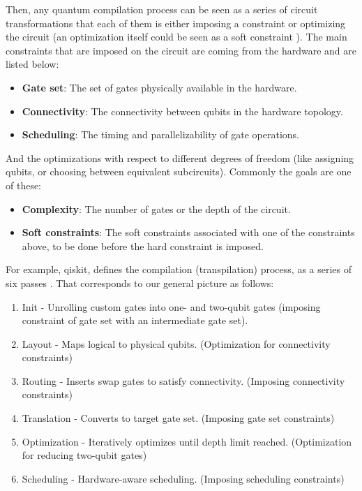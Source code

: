 \documentclass{report}
\begin{document}
Then, any quantum compilation process can be seen as a series of circuit transformations that each of them is either imposing a constraint or optimizing the circuit (an optimization itself could be seen as a soft constraint \cite{}). The main constraints that are imposed on the circuit are coming from the hardware and are listed below:

\begin{itemize}
  \item \textbf{Gate set}: The set of gates physically available in the hardware.
  \item \textbf{Connectivity}: The connectivity between qubits in the hardware topology.
  \item \textbf{Scheduling}: The timing and parallelizability of gate operations.
\end{itemize}
  
And the optimizations with respect to different degrees of freedom (like assigning qubits, or choosing between equivalent subcircuits). Commonly the goals are one of these:

\begin{itemize}
  \item \textbf{Complexity}: The number of gates or the depth of the circuit.
  \item \textbf{Soft constraints}: The soft constraints associated with one of the constraints above, to be done before the hard constraint is imposed.
\end{itemize}

For example, qiskit\texttrademark, defines the compilation (transpilation) process, as a series of six passes \cite{TODO}. That corresponds to our general picture as follows:

\begin{enumerate}
  \item Init - Unrolling custom gates into one- and two-qubit gates (imposing constraint of gate set with an intermediate gate set).
  \item Layout - Maps logical to physical qubits. (Optimization for connectivity constraints)
  \item Routing - Inserts swap gates to satisfy connectivity. (Imposing connectivity constraints)
  \item Translation - Converts to target gate set. (Imposing gate set constraints)
  \item Optimization - Iteratively optimizes until depth limit reached. (Optimization for reducing two-qubit gates)
  \item Scheduling - Hardware-aware scheduling. (Imposing scheduling constraints)
\end{enumerate}
\end{document}
